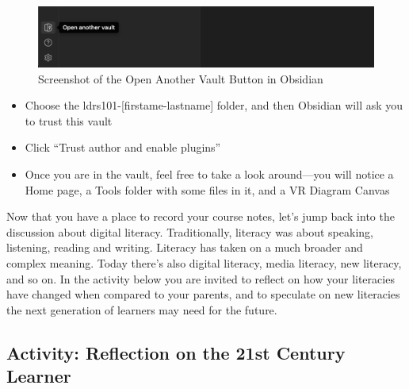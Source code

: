 \documentclass[
  letterpaper,
  DIV=11,
  numbers=noendperiod]{scrreprt}
\providecommand{\tightlist}{%
  \setlength{\itemsep}{0pt}\setlength{\parskip}{0pt}}\usepackage{longtable,booktabs,array}
\begin{document}
\begin{tcolorbox}
\begin{figure}[H]

\caption{\label{fig-image2}Screenshot of the Open Another Vault Button
in Obsidian}

\includegraphics{assets/u1/obsidian2.png}

\end{figure}%

\begin{itemize}
\tightlist
\item
  Choose the ldrs101-{[}firstame-lastname{]} folder, and then Obsidian
  will ask you to trust this vault
\item
  Click ``Trust author and enable plugins''
\item
  Once you are in the vault, feel free to take a look around---you will
  notice a Home page, a Tools folder with some files in it, and a VR
  Diagram Canvas
\end{itemize}

\end{tcolorbox}

Now that you have a place to record your course notes, let's jump back
into the discussion about digital literacy. Traditionally, literacy was
about speaking, listening, reading and writing. Literacy has taken on a
much broader and complex meaning. Today there's also digital literacy,
media literacy, new literacy, and so on. In the activity below you are
invited to reflect on how your literacies have changed when compared to
your parents, and to speculate on new literacies the next generation of
learners may need for the future.

\subsection{Activity: Reflection on the 21st Century
Learner}\label{activity-reflection-on-the-21st-century-learner}
\end{document}
